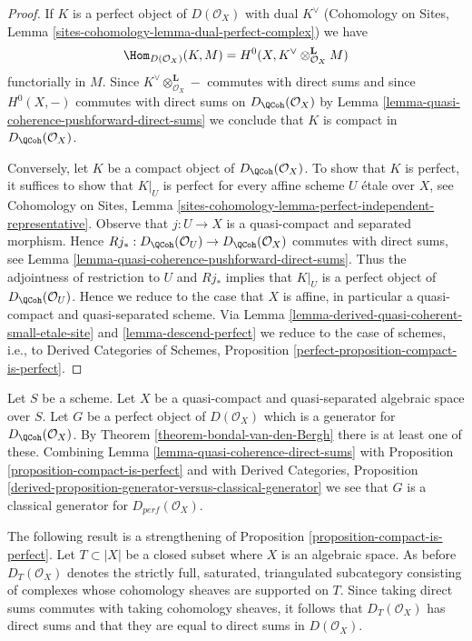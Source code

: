 \begin{proof}
If $K$ is a perfect object of $D(\mathcal{O}_X)$ with dual
$K^\vee$ (Cohomology on Sites, Lemma
\ref{sites-cohomology-lemma-dual-perfect-complex})
we have
$$
\Hom_{D(\mathcal{O}_X)}(K, M) =
H^0(X, K^\vee \otimes_{\mathcal{O}_X}^\mathbf{L} M)
$$
functorially in $M$. Since $K^\vee \otimes_{\mathcal{O}_X}^\mathbf{L} -$
commutes with direct sums and since $H^0(X, -)$ commutes with direct
sums on $D_\QCoh(\mathcal{O}_X)$ by
Lemma \ref{lemma-quasi-coherence-pushforward-direct-sums}
we conclude that $K$ is compact in $D_\QCoh(\mathcal{O}_X)$.

\medskip\noindent
Conversely, let $K$ be a compact object of $D_\QCoh(\mathcal{O}_X)$.
To show that $K$ is perfect, it suffices to show that
$K|_U$ is perfect for every affine scheme $U$ \'etale over $X$, see
Cohomology on Sites, Lemma
\ref{sites-cohomology-lemma-perfect-independent-representative}.
Observe that $j : U \to X$ is a quasi-compact and separated morphism.
Hence
$Rj_* : D_\QCoh(\mathcal{O}_U) \to D_\QCoh(\mathcal{O}_X)$
commutes with direct sums, see
Lemma \ref{lemma-quasi-coherence-pushforward-direct-sums}.
Thus the adjointness of restriction to $U$ and $Rj_*$ implies that
$K|_U$ is a perfect object of $D_\QCoh(\mathcal{O}_U)$.
Hence we reduce to the case that $X$ is affine, in particular a
quasi-compact and quasi-separated scheme. Via
Lemma \ref{lemma-derived-quasi-coherent-small-etale-site} and
\ref{lemma-descend-perfect}
we reduce to the case of schemes, i.e., to
Derived Categories of Schemes, Proposition
\ref{perfect-proposition-compact-is-perfect}.
\end{proof}

\begin{remark}
\label{remark-classical-generator}
Let $S$ be a scheme.
Let $X$ be a quasi-compact and quasi-separated algebraic space over $S$.
Let $G$ be a
perfect object of $D(\mathcal{O}_X)$ which is a generator for
$D_\QCoh(\mathcal{O}_X)$. By Theorem \ref{theorem-bondal-van-den-Bergh}
there is at least one of these. Combining
Lemma \ref{lemma-quasi-coherence-direct-sums} with
Proposition \ref{proposition-compact-is-perfect} and with
Derived Categories, Proposition
\ref{derived-proposition-generator-versus-classical-generator}
we see that $G$ is a classical generator for $D_{perf}(\mathcal{O}_X)$.
\end{remark}

\noindent
The following result is a strengthening of
Proposition \ref{proposition-compact-is-perfect}.
Let $T \subset |X|$ be a closed subset where $X$ is an algebraic space.
As before $D_T(\mathcal{O}_X)$ denotes the strictly full, saturated,
triangulated subcategory consisting of complexes whose
cohomology sheaves are supported on $T$. Since taking direct
sums commutes with taking cohomology sheaves, it follows
that $D_T(\mathcal{O}_X)$ has direct sums and that they are equal
to direct sums in $D(\mathcal{O}_X)$.

